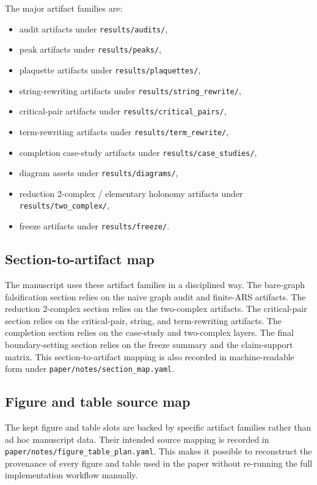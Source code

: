\documentclass[11pt]{article}
\numberwithin{equation}{section}
\newcommand{\code}[1]{\nolinkurl{#1}}
\theoremstyle{definition}
\theoremstyle{remark}
\begin{document}
The major artifact families are:
\begin{itemize}
    \item audit artifacts under \texttt{results/audits/},
    \item peak artifacts under \texttt{results/peaks/},
    \item plaquette artifacts under \texttt{results/plaquettes/},
    \item string-rewriting artifacts under \code{results/string_rewrite/},
    \item critical-pair artifacts under \code{results/critical_pairs/},
    \item term-rewriting artifacts under \code{results/term_rewrite/},
    \item completion case-study artifacts under \code{results/case_studies/},
    \item diagram assets under \texttt{results/diagrams/},
    \item reduction 2-complex / elementary holonomy artifacts under \code{results/two_complex/},
    \item freeze artifacts under \texttt{results/freeze/}.
\end{itemize}

\subsection{Section-to-artifact map}

The manuscript uses these artifact families in a disciplined way. The bare-graph falsification section relies on the naive graph audit and finite-ARS artifacts. The reduction 2-complex section relies on the two-complex artifacts. The critical-pair section relies on the critical-pair, string, and term-rewriting artifacts. The completion section relies on the case-study and two-complex layers. The final boundary-setting section relies on the freeze summary and the claim-support matrix. This section-to-artifact mapping is also recorded in machine-readable form under \code{paper/notes/section_map.yaml}.

\subsection{Figure and table source map}

The kept figure and table slots are backed by specific artifact families rather than ad hoc manuscript data. Their intended source mapping is recorded in \code{paper/notes/figure_table_plan.yaml}. This makes it possible to reconstruct the provenance of every figure and table used in the paper without re-running the full implementation workflow manually.
\end{document}
